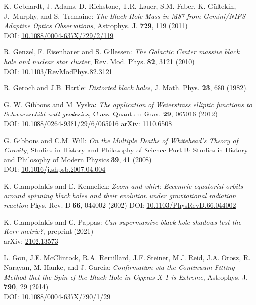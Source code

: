 \begin{thebibliography}{123}
K. Gebhardt, J. Adams, D. Richstone, T.R. Lauer, S.M. Faber, K. Gültekin, J.~Murphy, and S.~Tremaine:
{\em The Black Hole Mass in M87 from Gemini/NIFS Adaptive Optics Observations},
Astrophys. J. {\bf 729}, 119 (2011)\\
DOI: \href{https://doi.org/10.1088/0004-637X/729/2/119}{10.1088/0004-637X/729/2/119}

R. Genzel, F. Eisenhauer and S. Gillessen:
{\em The Galactic Center massive black hole and nuclear star cluster},
Rev. Mod. Phys. {\bf 82}, 3121 (2010)\\
DOI: \href{https://doi.org/10.1103/RevModPhys.82.3121}{10.1103/RevModPhys.82.3121}

R. Geroch and J.B. Hartle: {\em Distorted black holes},
J. Math. Phys. {\bf 23}, 680 (1982).

G. W. Gibbons and M. Vyska:
{\em The application of Weierstrass elliptic functions to Schwarzschild null geodesics},
Class. Quantum Grav. {\bf 29}, 065016 (2012)\\
DOI: \href{https://doi.org/10.1088/0264-9381/29/6/065016}{10.1088/0264-9381/29/6/065016}\hfill
arXiv: \href{https://arxiv.org/abs/1110.6508}{1110.6508}

G. Gibbons and C.M. Will: {\em On the Multiple Deaths of Whitehead's Theory of Gravity},
Studies in History and Philosophy of Science Part B: Studies in History and Philosophy of Modern Physics {\bf 39}, 41 (2008)\\
DOI: \href{https://doi.org/10.1016/j.shpsb.2007.04.004}{10.1016/j.shpsb.2007.04.004}

K. Glampedakis and D. Kennefick:
{\em Zoom and whirl: Eccentric equatorial orbits around spinning black holes and their evolution under gravitational radiation reaction}
Phys. Rev. D {\bf 66}, 044002 (2002)
DOI: \href{https://doi.org/10.1103/PhysRevD.66.044002}{10.1103/PhysRevD.66.044002}

K. Glampedakis and G. Pappas:
{\em Can supermassive black hole shadows test the Kerr metric?},
preprint (2021)\\
arXiv: \href{https://arxiv.org/abs/2102.13573}{2102.13573}

L. Gou, J.E. McClintock, R.A. Remillard, J.F. Steiner, M.J. Reid, J.A. Orosz, R. Narayan, M. Hanke, and J. García:
{\em Confirmation via the Continuum-Fitting Method that the Spin of the Black Hole in Cygnus X-1 is Extreme},
Astrophys. J. {\bf 790}, 29 (2014)\\
DOI: \href{https://doi.org/10.1088/0004-637X/790/1/29}{10.1088/0004-637X/790/1/29}


\end{thebibliography}
